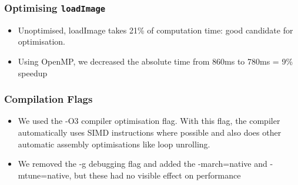 \begin{frame}
  \frametitle{Optimising \lstinline{loadImage}}
    \begin{itemize}
        \item Unoptimised, loadImage takes 21\% of computation time: good candidate for optimisation.
        \item Using OpenMP, we decreased the absolute time from 860ms to 780ms = 9\% speedup
    \end{itemize}
    \begin{exampleblock}{}
        
    \end{exampleblock}

\end{frame}

\begin{frame}
  \frametitle{Compilation Flags}
    \begin{itemize}
        \item We used the -O3 compiler optimisation flag. With this flag, the compiler automatically uses SIMD instructions where possible and also does other automatic assembly optimisations like loop unrolling.
        \item We removed the -g debugging flag and added the -march=native and -mtune=native, but these had no visible effect on performance
    \end{itemize}
\end{frame}


